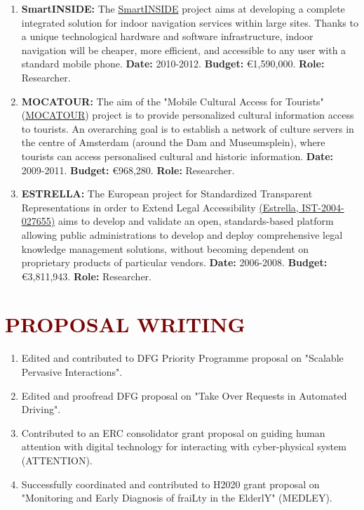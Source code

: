\documentclass{article}
\begin{document}
\begin{enumerate}

\item \textbf{SmartINSIDE:} The \href{https://www.eurostars-eureka.eu/project/id/5262}{SmartINSIDE} project aims at developing a complete integrated solution for indoor navigation services within large sites. Thanks to a unique technological hardware and software infrastructure, indoor navigation will be cheaper, more efficient, and accessible to any user with a standard mobile phone. \textbf{Date:} 2010-2012. \textbf{Budget:} \euro 1,590,000. \textbf{Role:} Researcher.

\item \textbf{MOCATOUR:} The aim of the "Mobile Cultural Access for Tourists" (\href{https://mocatour.wordpress.com/}{MOCATOUR}) project is to provide personalized cultural information access to tourists. An overarching goal is to establish a network of culture servers in the centre of Amsterdam (around the Dam and Museumsplein), where tourists can access personalised cultural and historic information. \textbf{Date:} 2009-2011. \textbf{Budget:} \euro 968,280. \textbf{Role:} Researcher.

\item \textbf{ESTRELLA:} The European project for Standardized Transparent Representations in order to Extend Legal Accessibility \href{http://www.estrellaproject.org/}{(Estrella, IST-2004-027655)} aims to develop and validate an open, standards-based platform allowing public administrations to develop and deploy comprehensive legal knowledge management solutions, without becoming dependent on proprietary products of particular vendors. \textbf{Date:} 2006-2008. \textbf{Budget:} \euro 3,811,943. \textbf{Role:} Researcher.

\end{enumerate}



\section*{\textcolor{maroon}{\normalsize PROPOSAL WRITING}} 

\begin{enumerate}

\item Edited and contributed to DFG Priority Programme proposal on "Scalable Pervasive Interactions". 

\item Edited and proofread DFG proposal on "Take Over Requests in Automated Driving". 

\item Contributed to an ERC consolidator grant proposal on guiding human attention with digital technology for interacting with cyber-physical system (ATTENTION).

\item Successfully coordinated and contributed to H2020 grant proposal on "Monitoring and Early Diagnosis of fraiLty in the ElderlY" (MEDLEY).

\end{enumerate}
\end{document}
